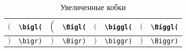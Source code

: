\begin{table}
	\begin{tabular}{|c|c||c|c||c|c||c|c|}
		\hline $\bigl($ & \Verb|\bigl(|
		& $\Bigl($ & \Verb|\Bigl(| 
		& $\biggl($ & \Verb|\biggl(|
		& $\Biggl($ & \Verb|\Biggl(| \\ 
		
		\hline $\bigr)$ & \Verb|\bigr)| 
		& $\Bigr)$ & \Verb|\Bigr)| 
		& $\biggr)$ & \Verb|\biggr)| 
		& $\Biggr)$ & \Verb|\Biggr)| \\ 
		\hline 
	\end{tabular}
	\caption{Увеличенные кобки}
\end{table}